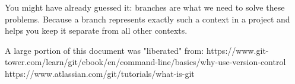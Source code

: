 \documentclass{article}
\begin{document}
You might have already guessed it: branches are what we need to solve these problems. Because a branch represents exactly such a context in a project and helps you keep it separate from all other contexts.



\begin{thebibliography}{9}
A large portion of this document was "liberated" from:
https://www.git-tower.com/learn/git/ebook/en/command-line/basics/why-use-version-control
https://www.atlassian.com/git/tutorials/what-is-git
\end{thebibliography}
\end{document}
